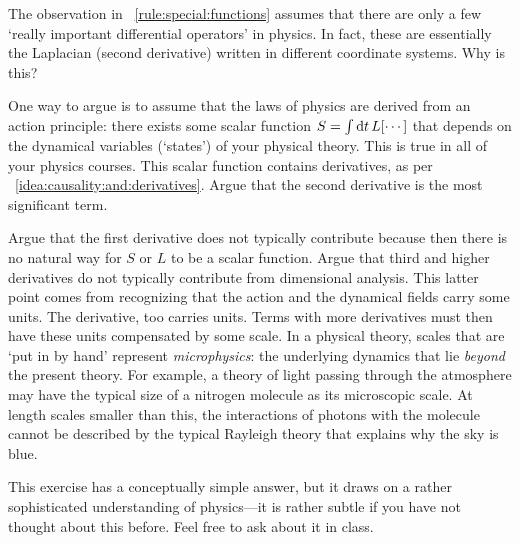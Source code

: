 \documentclass[12pt, oneside]{report}    %
\begin{document}
\begin{exercise}\label{ex:few:differential:ops}
The observation in \bigidearef{}~\ref{rule:special:functions} assumes that there are only a few `really important differential operators' in physics. In fact, these are essentially the Laplacian (second derivative) written in different coordinate systems. Why is this? 

One way to argue is to assume that the laws of physics are derived from an action principle: there exists some scalar function  $S=\int \operatorname{d}\!{t}\, L[\cdots]$ that depends on the dynamical variables (`states') of your physical theory. This is true in all of your physics courses.  This scalar function contains derivatives, as per \bigidearef{}~\ref{idea:causality:and:derivatives}. Argue that the second derivative is the most significant term.

Argue that the first derivative does not typically contribute because then there is no natural way for $S$ or $L$ to be a scalar function. Argue that third and higher derivatives do not typically contribute from dimensional analysis. This latter point comes from recognizing that the action and the dynamical fields carry some units. The derivative, too carries units. Terms with more derivatives must then have these units compensated by some scale. In a physical theory, scales that are `put in by hand' represent \emph{microphysics}: the underlying dynamics that lie \emph{beyond} the present theory. For example, a theory of light passing through the atmosphere may have the typical size of a nitrogen molecule as its microscopic scale. At length scales smaller than this, the interactions of photons with the molecule cannot be described by the typical Rayleigh theory that explains why the sky is blue.

This exercise has a conceptually simple answer, but it draws on a rather sophisticated understanding of physics---it is rather subtle if you have not thought about this before. Feel free to ask about it in class. 
\end{exercise}
\end{document}
